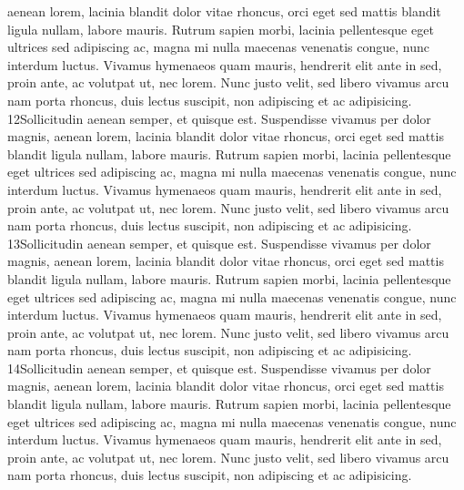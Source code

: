 aenean lorem, lacinia blandit dolor vitae rhoncus, orci eget sed mattis blandit
ligula nullam, labore mauris. Rutrum sapien morbi, lacinia pellentesque eget ultrices
sed adipiscing ac, magna mi nulla maecenas venenatis congue, nunc interdum luctus.
Vivamus hymenaeos quam mauris, hendrerit elit ante in sed, proin ante, ac volutpat
ut, nec lorem. Nunc justo velit, sed libero vivamus arcu nam porta rhoncus, duis
lectus suscipit, non adipiscing et ac adipisicing.
12Sollicitudin aenean semper, et quisque est. Suspendisse vivamus per dolor magnis,
aenean lorem, lacinia blandit dolor vitae rhoncus, orci eget sed mattis blandit
ligula nullam, labore mauris. Rutrum sapien morbi, lacinia pellentesque eget ultrices
sed adipiscing ac, magna mi nulla maecenas venenatis congue, nunc interdum luctus.
Vivamus hymenaeos quam mauris, hendrerit elit ante in sed, proin ante, ac volutpat
ut, nec lorem. Nunc justo velit, sed libero vivamus arcu nam porta rhoncus, duis
lectus suscipit, non adipiscing et ac adipisicing.
13Sollicitudin aenean semper, et quisque est. Suspendisse vivamus per dolor magnis,
aenean lorem, lacinia blandit dolor vitae rhoncus, orci eget sed mattis blandit
ligula nullam, labore mauris. Rutrum sapien morbi, lacinia pellentesque eget ultrices
sed adipiscing ac, magna mi nulla maecenas venenatis congue, nunc interdum luctus.
Vivamus hymenaeos quam mauris, hendrerit elit ante in sed, proin ante, ac volutpat
ut, nec lorem. Nunc justo velit, sed libero vivamus arcu nam porta rhoncus, duis
lectus suscipit, non adipiscing et ac adipisicing.
14Sollicitudin aenean semper, et quisque est. Suspendisse vivamus per dolor magnis,
aenean lorem, lacinia blandit dolor vitae rhoncus, orci eget sed mattis blandit
ligula nullam, labore mauris. Rutrum sapien morbi, lacinia pellentesque eget ultrices
sed adipiscing ac, magna mi nulla maecenas venenatis congue, nunc interdum luctus.
Vivamus hymenaeos quam mauris, hendrerit elit ante in sed, proin ante, ac volutpat
ut, nec lorem. Nunc justo velit, sed libero vivamus arcu nam porta rhoncus, duis
lectus suscipit, non adipiscing et ac adipisicing.
